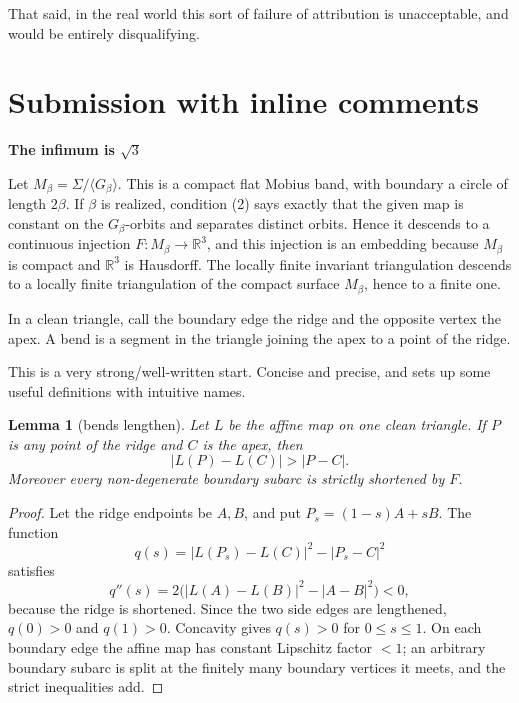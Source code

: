 \documentclass[12pt]{article}
\newtheorem{lemma}{Lemma}
\newcommand{\R}{\mathbb R}
\newcommand{\review}[1]{\begin{reviewbox}#1\end{reviewbox}}
\begin{document}
  That said, in the real world this sort of failure of attribution is unacceptable, and would be entirely disqualifying.

  \section{Submission with inline comments}


\date{}


\begin{center}
{\bf The infimum is \(\sqrt3\)}
\end{center}

Let \(M_\beta=\Sigma/\langle G_\beta\rangle\).  This is a compact flat
Mobius band, with boundary a circle of length \(2\beta\).  If \(\beta\)
is realized, condition (2) says exactly that the given map is constant on
the \(G_\beta\)-orbits and separates distinct orbits.  Hence it descends
to a continuous injection \(F:M_\beta\to\R^3\), and this injection is an
embedding because \(M_\beta\) is compact and \(\R^3\) is Hausdorff.  The
locally finite invariant triangulation descends to a locally finite
triangulation of the compact surface \(M_\beta\), hence to a finite one.

In a clean triangle, call the boundary edge the ridge and the opposite
vertex the apex.  A bend is a segment in the triangle joining the apex to
a point of the ridge.

\review{This is a very strong/well-written start. Concise and precise, and sets up some useful definitions with intuitive names.}

\begin{lemma}[bends lengthen]\label{lem:lengthen}
Let \(L\) be the affine map on one clean triangle.  If \(P\) is any point
of the ridge and \(C\) is the apex, then
\[
        |L(P)-L(C)|>|P-C|.
\]
Moreover every non-degenerate boundary subarc is strictly shortened by
\(F\).
\end{lemma}

\begin{proof}
Let the ridge endpoints be \(A,B\), and put \(P_s=(1-s)A+sB\).  The
function
\[
 q(s)= |L(P_s)-L(C)|^2-|P_s-C|^2
\]
satisfies
\[
 q''(s)=2\big(|L(A)-L(B)|^2-|A-B|^2\big)<0,
\]
because the ridge is shortened.  Since the two side edges are lengthened,
\(q(0)>0\) and \(q(1)>0\).  Concavity gives \(q(s)>0\) for
\(0\le s\le1\).  On each boundary edge the affine map has constant
Lipschitz factor \(<1\); an arbitrary boundary subarc is split at the
finitely many boundary vertices it meets, and the strict inequalities add.
\end{proof}
\end{document}
